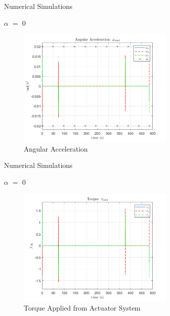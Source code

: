 \documentclass{beamer}
\begin{document}
\begin{frame}{Numerical Simulations}
	\begin{block}{$\alpha$ $=$ 0}
		
		
		\begin{figure}[H]
			\label{fig:ang_accel_total_alpha0}
			\begin{center}
				\includegraphics[width=3in]{figures/alpha0/ang_accel.png}
			\end{center}
			\caption{Angular Acceleration}
		\end{figure}
		
	\end{block}
\end{frame}
\begin{frame}{Numerical Simulations}
	\begin{block}{$\alpha$ $=$ 0}
		
		\begin{figure}[H]
			\label{fig:torque_total_alpha0}
			\begin{center}
				\includegraphics[width=3in]{figures/alpha0/torque.png}
			\end{center}
			\caption{Torque Applied from Actuator System}
		\end{figure}
		
	\end{block}
\end{frame}
\end{document}
